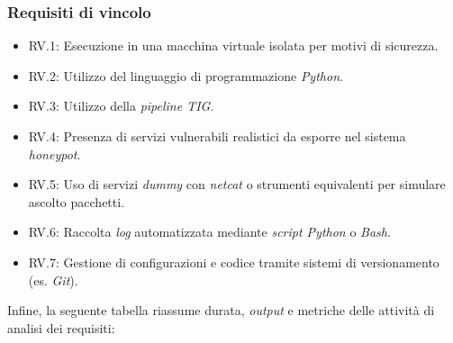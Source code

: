 \subsubsection*{Requisiti di vincolo}
\begin{itemize}[noitemsep, topsep=0pt]
    \item RV.1: Esecuzione in una macchina virtuale isolata per motivi di sicurezza.
    \item RV.2: Utilizzo del linguaggio di programmazione \textit{Python}.
    \item RV.3: Utilizzo della \textit{pipeline TIG}.
    \item RV.4: Presenza di servizi vulnerabili realistici da esporre nel sistema \textit{honeypot}.
    \item RV.5: Uso di servizi \textit{dummy} con \textit{netcat} o strumenti equivalenti per simulare ascolto pacchetti.
    \item RV.6: Raccolta \textit{log} automatizzata mediante \textit{script Python} o \textit{Bash}.
    \item RV.7: Gestione di configurazioni e codice tramite sistemi di versionamento (es. \textit{Git}).
\end{itemize}
Infine, la seguente tabella riassume durata, \textit{output} e metriche delle attività di analisi dei requisiti:
